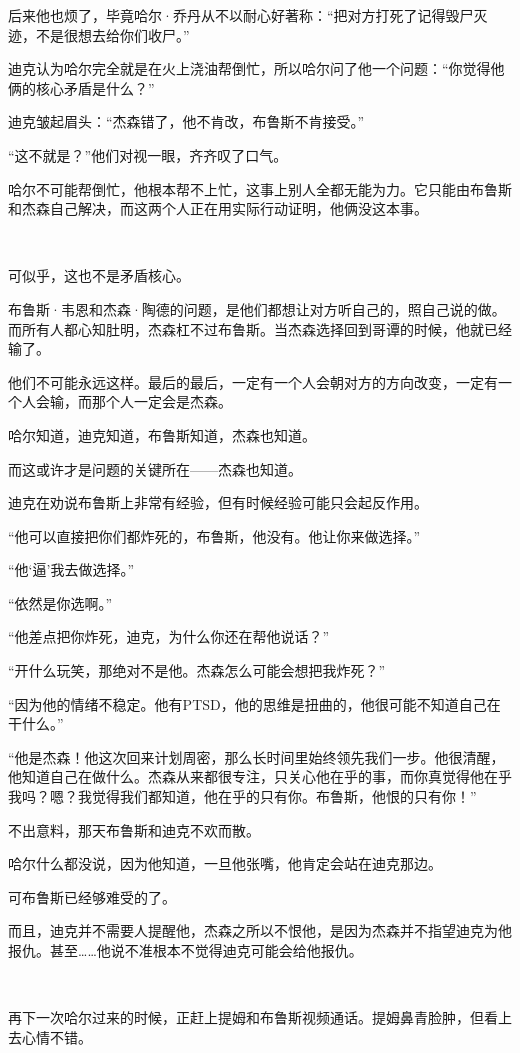 \documentclass[../main]{subfiles}
\begin{document}
后来他也烦了，毕竟哈尔·乔丹从不以耐心好著称：“把对方打死了记得毁尸灭迹，不是很想去给你们收尸。”

迪克认为哈尔完全就是在火上浇油帮倒忙，所以哈尔问了他一个问题：“你觉得他俩的核心矛盾是什么？”

迪克皱起眉头：“杰森错了，他不肯改，布鲁斯不肯接受。”

“这不就是？”他们对视一眼，齐齐叹了口气。

哈尔不可能帮倒忙，他根本帮不上忙，这事上别人全都无能为力。它只能由布鲁斯和杰森自己解决，而这两个人正在用实际行动证明，他俩没这本事。

~\

可似乎，这也不是矛盾核心。

布鲁斯·韦恩和杰森·陶德的问题，是他们都想让对方听自己的，照自己说的做。而所有人都心知肚明，杰森杠不过布鲁斯。当杰森选择回到哥谭的时候，他就已经输了。

他们不可能永远这样。最后的最后，一定有一个人会朝对方的方向改变，一定有一个人会输，而那个人一定会是杰森。

哈尔知道，迪克知道，布鲁斯知道，杰森也知道。

而这或许才是问题的关键所在——杰森也知道。

迪克在劝说布鲁斯上非常有经验，但有时候经验可能只会起反作用。

“他可以直接把你们都炸死的，布鲁斯，他没有。他让你来做选择。”

“他‘逼’我去做选择。”

“依然是你选啊。”

“他差点把你炸死，迪克，为什么你还在帮他说话？”

“开什么玩笑，那绝对不是他。杰森怎么可能会想把我炸死？”

“因为他的情绪不稳定。他有PTSD，他的思维是扭曲的，他很可能不知道自己在干什么。”

“他是杰森！他这次回来计划周密，那么长时间里始终领先我们一步。他很清醒，他知道自己在做什么。杰森从来都很专注，只关心他在乎的事，而你真觉得他在乎我吗？嗯？我觉得我们都知道，他在乎的只有你。布鲁斯，他恨的只有你！”

不出意料，那天布鲁斯和迪克不欢而散。

哈尔什么都没说，因为他知道，一旦他张嘴，他肯定会站在迪克那边。

可布鲁斯已经够难受的了。

而且，迪克并不需要人提醒他，杰森之所以不恨他，是因为杰森并不指望迪克为他报仇。甚至……他说不准根本不觉得迪克可能会给他报仇。

~\

再下一次哈尔过来的时候，正赶上提姆和布鲁斯视频通话。提姆鼻青脸肿，但看上去心情不错。
\end{document}
